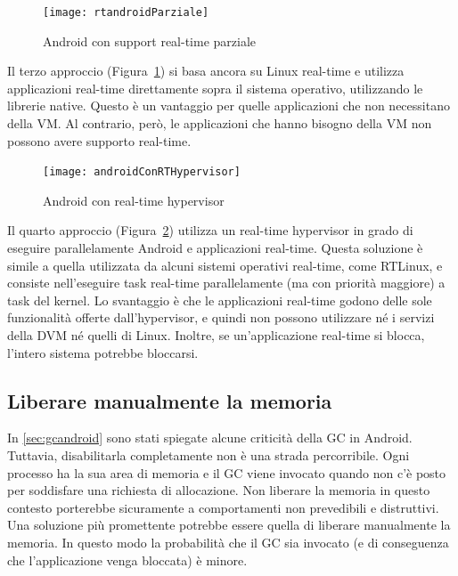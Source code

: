 \begin{figure}[h]
	\centering
	\texttt{[image: rtandroidParziale]}
	\caption{Android con support real-time parziale}
	\label{fig:rtandroidparziale}
\end{figure}
Il terzo approccio (Figura~\ref{fig:rtandroidparziale}) si basa ancora su Linux real-time e utilizza applicazioni real-time direttamente sopra il sistema operativo, utilizzando le librerie native. Questo è un vantaggio per quelle applicazioni che non necessitano della VM. Al contrario, però, le applicazioni che hanno bisogno della VM non possono avere supporto real-time.

\begin{figure}[h]
	\centering
	\texttt{[image: androidConRTHypervisor]}
	\caption{Android con real-time hypervisor}
	\label{fig:androidconrthypervisor}
\end{figure}
Il quarto approccio (Figura~\ref*{fig:androidconrthypervisor}) utilizza un real-time hypervisor in grado di eseguire parallelamente Android e applicazioni real-time. Questa soluzione è simile a quella utilizzata da alcuni sistemi operativi real-time, come RTLinux, e consiste nell'eseguire task real-time parallelamente (ma con priorità maggiore) a task del kernel. Lo svantaggio è che le applicazioni real-time godono delle sole funzionalità offerte dall'hypervisor, e quindi non possono utilizzare né i servizi della DVM né quelli di Linux. Inoltre, se un'applicazione real-time si blocca, l'intero sistema potrebbe bloccarsi.

\subsection{Liberare manualmente la memoria}
In \ref{sec:gcandroid} sono stati spiegate alcune criticità della GC in Android. Tuttavia, disabilitarla completamente non è una strada percorribile. Ogni processo ha la sua area di memoria e il GC viene invocato quando non c'è posto per soddisfare una richiesta di allocazione. Non liberare la memoria in questo contesto porterebbe sicuramente a comportamenti non prevedibili e distruttivi. Una soluzione più promettente potrebbe essere quella di liberare manualmente la memoria. In questo modo la probabilità che il GC sia invocato (e di conseguenza che l'applicazione venga bloccata) è minore. 

